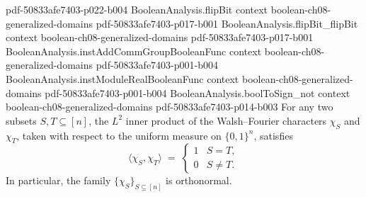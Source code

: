 \begin{theorem}
{    pdf-50833afe7403-p022-b004}
\proofstep
  {BooleanAnalysis.flipBit}
  {context}
  {boolean-ch08-generalized-domains}
  {pdf-50833afe7403-p017-b001}
\proofstep
  {BooleanAnalysis.flipBit_flipBit}
  {context}
  {boolean-ch08-generalized-domains}
  {pdf-50833afe7403-p017-b001}
\proofstep
  {BooleanAnalysis.instAddCommGroupBooleanFunc}
  {context}
  {boolean-ch08-generalized-domains}
  {pdf-50833afe7403-p001-b004}
\proofstep
  {BooleanAnalysis.instModuleRealBooleanFunc}
  {context}
  {boolean-ch08-generalized-domains}
  {pdf-50833afe7403-p001-b004}
\proofstep
  {BooleanAnalysis.boolToSign_not}
  {context}
  {boolean-ch08-generalized-domains}
  {pdf-50833afe7403-p014-b003}
For any two subsets $S, T \subseteq [n]$, the $L^2$ inner product of the Walsh--Fourier
characters $\chi_S$ and $\chi_T$, taken with respect to the uniform measure on
$\{0,1\}^n$, satisfies
\[
\langle \chi_S, \chi_T\rangle \;=\; \begin{cases} 1 & S = T,\\ 0 & S \neq T. \end{cases}
\]
In particular, the family $\{\chi_S\}_{S\subseteq[n]}$ is orthonormal.
\end{theorem}

